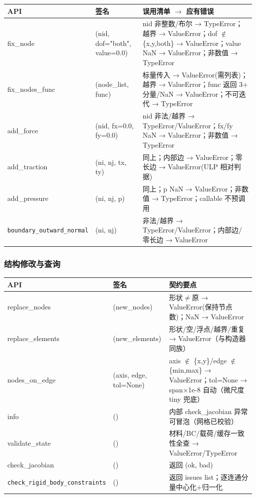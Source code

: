 \documentclass[12pt,a4paper]{ctexart}
\begin{document}
\begin{longtable}{p{4.2cm}p{4.0cm}p{6.0cm}}
\toprule
\textbf{API} & \textbf{签名} & \textbf{误用清单 $\to$ 应有错误} \\
\midrule
fix\_node & (nid, dof="both", value=0.0) & nid 非整数/布尔 → TypeError；越界 → ValueError；dof $\notin$ \{x,y,both\} → ValueError；value NaN → ValueError；非数值 → TypeError \\
fix\_nodes\_func & (node\_list, func) & 标量传入 → ValueError(需列表)；越界 → ValueError；func 返回 3+ 分量/NaN → ValueError；不可迭代 → TypeError \\
add\_force & (nid, fx=0.0, fy=0.0) & nid 非法/越界 → TypeError/ValueError；fx/fy NaN → ValueError；非数值 → TypeError \\
add\_traction & (ni, nj, tx, ty) & 同上；内部边 → ValueError；零长边 → ValueError(ULP 相对判据) \\
add\_pressure & (ni, nj, p) & 同上；p NaN → ValueError；非数值 → TypeError；callable 不预调用 \\
\texttt{boundary\_outward\_\newline normal} & (ni, nj) & 非法/越界 → TypeError/ValueError；内部边/零长边 → ValueError \\
\bottomrule
\end{longtable}

\subsubsection{结构修改与查询}

\begin{longtable}{p{3.8cm}p{3.7cm}p{6.9cm}}
\toprule
\textbf{API} & \textbf{签名} & \textbf{契约要点} \\
\midrule
replace\_nodes & (new\_nodes) & 形状$\neq$原 → ValueError(保持节点数)；NaN → ValueError \\
replace\_elements & (new\_elements) & 形状/空/浮点/越界/重复 → ValueError（与构造器同族） \\
nodes\_on\_edge & (axis, edge, tol=None) & axis $\notin$ \{x,y\}/edge $\notin$ \{min,max\} → ValueError；tol=None → span×1e-8 自动（微尺度 tiny 兜底） \\
info & () & 内部 check\_jacobian 异常可冒泡（网格已校验） \\
validate\_state & () & 材料/BC/载荷/缓存一致性全查 → ValueError/TypeError \\
check\_jacobian & () & 返回 (ok, bad) \\
\texttt{check\_rigid\_body\_\newline constraints} & () & 返回 issues list；逐连通分量中心化+归一化 \\
\bottomrule
\end{longtable}
\end{document}
